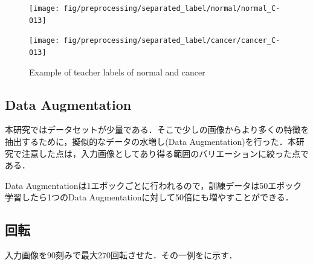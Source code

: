 \begin{figure}[H]
	\centering
	
	\begin{minipage}{0.4\columnwidth}
		\centering
		\texttt{[image: fig/preprocessing/separated\_label/normal/normal\_C-013]}
	\end{minipage}
	\begin{minipage}{0.4\columnwidth}
		\centering
		\texttt{[image: fig/preprocessing/separated\_label/cancer/cancer\_C-013]}
	\end{minipage}
	
	\caption{Example of teacher labels of normal and cancer}
	\label{fig:検体A教師ラベル}
	
\end{figure}


\subsection{Data Augmentation}
本研究ではデータセットが少量である．そこで少しの画像からより多くの特徴を抽出するために，擬似的なデータの水増し(Data Augmentation)を行った．本研究で注意した点は，入力画像としてあり得る範囲のバリエーションに絞った点である．

Data Augmentationは1エポックごとに行われるので，訓練データは50エポック学習したら1つのData Augmentationに対して50倍にも増やすことができる．

\subsection*{回転}
入力画像を90\deg 刻みで最大270\deg 回転させた．その一例をに示す．

